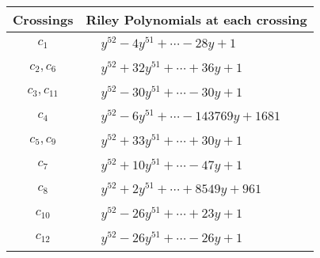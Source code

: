 \documentclass[1p]{elsarticle_modified}
\theoremstyle{definition}
\begin{document}
\begin{tabular}{m{50pt}|m{274pt}}
Crossings & \hspace{64pt}Riley Polynomials at each crossing \\
\hline $$\begin{aligned}c_{1}\end{aligned}$$&$\begin{aligned}
&y^{52}-4 y^{51}+\cdots-28 y+1
\end{aligned}$\\
\hline $$\begin{aligned}c_{2},c_{6}\end{aligned}$$&$\begin{aligned}
&y^{52}+32 y^{51}+\cdots+36 y+1
\end{aligned}$\\
\hline $$\begin{aligned}c_{3},c_{11}\end{aligned}$$&$\begin{aligned}
&y^{52}-30 y^{51}+\cdots-30 y+1
\end{aligned}$\\
\hline $$\begin{aligned}c_{4}\end{aligned}$$&$\begin{aligned}
&y^{52}-6 y^{51}+\cdots-143769 y+1681
\end{aligned}$\\
\hline $$\begin{aligned}c_{5},c_{9}\end{aligned}$$&$\begin{aligned}
&y^{52}+33 y^{51}+\cdots+30 y+1
\end{aligned}$\\
\hline $$\begin{aligned}c_{7}\end{aligned}$$&$\begin{aligned}
&y^{52}+10 y^{51}+\cdots-47 y+1
\end{aligned}$\\
\hline $$\begin{aligned}c_{8}\end{aligned}$$&$\begin{aligned}
&y^{52}+2 y^{51}+\cdots+8549 y+961
\end{aligned}$\\
\hline $$\begin{aligned}c_{10}\end{aligned}$$&$\begin{aligned}
&y^{52}-26 y^{51}+\cdots+23 y+1
\end{aligned}$\\
\hline $$\begin{aligned}c_{12}\end{aligned}$$&$\begin{aligned}
&y^{52}-26 y^{51}+\cdots-26 y+1
\end{aligned}$\\
\hline
\end{tabular}\\~\\
\end{document}
